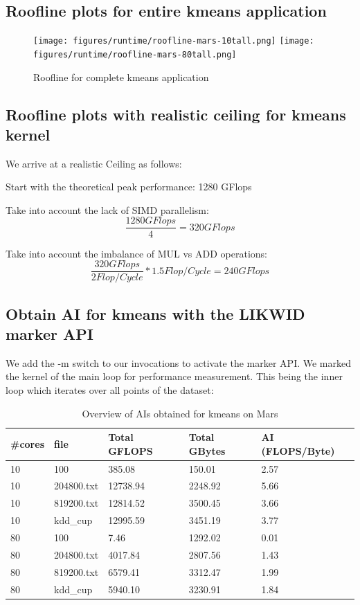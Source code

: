 \subsection{Roofline plots for entire kmeans application}

\begin{figure}[ht]
	\centering
	\texttt{[image: figures/runtime/roofline-mars-10tall.png]}
	\texttt{[image: figures/runtime/roofline-mars-80tall.png]}
	\caption{Roofline for complete kmeans application}
	\label{fig:runtime}
\end{figure}

\subsection{Roofline plots with realistic ceiling for kmeans kernel}

We arrive at a realistic Ceiling as follows:

Start with the theoretical peak performance: 1280 GFlops

Take into account the lack of SIMD parallelism:
$$\frac{1280 GFlops}{4} = 320 GFlops$$

Take into account the imbalance of MUL vs ADD operations:
$$\frac{320 GFlops}{2 Flop/Cycle} *1.5 Flop/Cycle = 240 GFlops$$

\subsection{Obtain AI for kmeans with the LIKWID marker API}

We add the -m switch to our invocations to activate the marker API.
We marked the kernel of the main loop for performance measurement.
This being the inner loop which iterates over all points of the dataset:

\begin{table}[h]
\centering
\caption{\label{tab:ai_tab}Overview of AIs obtained for kmeans on Mars}
\begin{small}
\begin{tabular}{lllll}
\toprule
\#cores & file & Total GFLOPS & Total GBytes & AI (FLOPS/Byte) \\
\midrule
10 & 100 & 385.08 & 150.01 & 2.57 \\
10 & 204800.txt & 12738.94 & 2248.92 & 5.66 \\
10 & 819200.txt & 12814.52 & 3500.45 & 3.66 \\
10 & kdd\_cup & 12995.59 & 3451.19 & 3.77 \\
80 & 100 & 7.46 & 1292.02 & 0.01 \\
80 & 204800.txt & 4017.84 & 2807.56 & 1.43 \\
80 & 819200.txt & 6579.41 & 3312.47 & 1.99 \\
80 & kdd\_cup & 5940.10 & 3230.91 & 1.84 \\

\bottomrule
\end{tabular}
\end{small}
\end{table}

